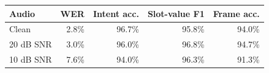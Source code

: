 \begin{tabular}{lrrrr}
\toprule
Audio & WER & Intent acc. & Slot-value F1 & Frame acc. \\
\midrule
Clean & 2.8\% & 96.7\% & 95.8\% & 94.0\% \\
20 dB SNR & 3.0\% & 96.0\% & 96.8\% & 94.7\% \\
10 dB SNR & 7.6\% & 94.0\% & 96.3\% & 91.3\% \\
\bottomrule
\end{tabular}
